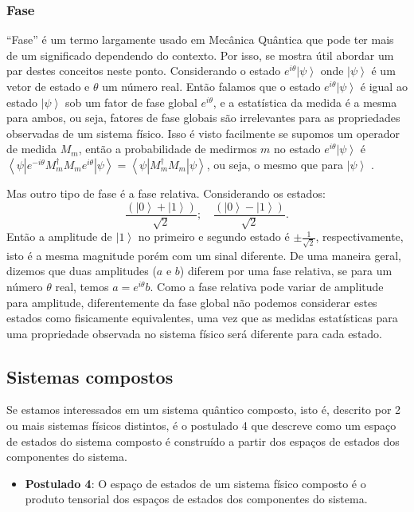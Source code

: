\subsubsection{Fase}
``Fase''  é um termo largamente usado em Mecânica Quântica que pode ter mais de um significado dependendo do contexto. Por isso, se mostra útil abordar um par destes conceitos neste ponto. Considerando o estado  $e^{i\theta}\left|\psi\right\rangle $ onde $\left|\psi\right\rangle $ é um vetor de estado e $\theta$  um número real. Então falamos que o estado $e^{i\theta}\left|\psi\right\rangle $ é igual ao estado $\left|\psi\right\rangle $ sob um fator de fase global $e^{i\theta}$, e a estatística da medida é a mesma para ambos, ou seja, fatores de fase globais são irrelevantes para as propriedades observadas de um sistema físico. Isso é visto facilmente se supomos um operador de medida $M_m$, então a probabilidade de medirmos $m$ no estado $e^{i\theta}\left|\psi\right\rangle $ é $\left\langle \psi\left|e^{-i\theta}M_{m}^{\dagger}M_{m}e^{i\theta}\right|\psi\right\rangle =\left\langle \psi\left|M_{m}^{\dagger}M_{m}\right|\psi\right\rangle $, ou seja, o mesmo que para $\left|\psi\right\rangle $ .

Mas outro tipo de fase é a fase relativa. Considerando os estados:
\begin{equation}\frac{\left(\left|0\right\rangle +\left|1\right\rangle \right)}{\sqrt{2}}; \quad \frac{\left(\left|0\right\rangle -\left|1\right\rangle \right)}{\sqrt{2}}. \end{equation}Então a amplitude de $\left|1\right\rangle $ no primeiro e segundo estado é $\pm\frac{1}{\sqrt{2}}$, respectivamente, isto é a mesma magnitude porém com um sinal diferente. De uma maneira geral, dizemos que duas amplitudes ($a$ e $b$) diferem por uma fase relativa, se para um número $\theta$ real, temos  $a=e^{i\theta}b$.  Como a fase relativa pode variar de amplitude para amplitude,  diferentemente  da fase global não podemos considerar estes estados como fisicamente equivalentes, uma vez que as medidas estatísticas para uma propriedade observada no sistema físico será diferente para cada estado.

\subsection{Sistemas compostos}
Se estamos interessados em um sistema quântico composto, isto é, descrito por 2 ou mais sistemas físicos distintos, é o postulado 4 que descreve como um espaço de estados do sistema composto é construído a partir dos espaços de estados dos componentes do sistema.
\begin{itemize}
\item \textbf{Postulado 4}: O espaço de estados de um sistema físico composto é o produto tensorial dos espaços de estados dos componentes do sistema.
\end{itemize}

